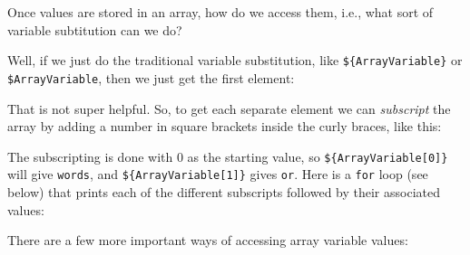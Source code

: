 \documentclass[]{krantz}
\makeatletter
\newenvironment{Shaded}{\begin{snugshade}}{\end{snugshade}}
\newcommand{\BuiltInTok}[1]{#1}
\newcommand{\CommentTok}[1]{\textcolor[rgb]{0.37,0.37,0.37}{\textit{#1}}}
\newcommand{\DataTypeTok}[1]{\textcolor[rgb]{0.27,0.27,0.27}{#1}}
\newcommand{\ExtensionTok}[1]{#1}
\newcommand{\KeywordTok}[1]{\textcolor[rgb]{0.27,0.27,0.27}{\textbf{#1}}}
\newcommand{\NormalTok}[1]{#1}
\newcommand{\VariableTok}[1]{\textcolor[rgb]{0,0,0}{#1}}
\newenvironment{kframe}{%
\medskip{}
\setlength{\fboxsep}{.8em}
 \def\at@end@of@kframe{}%
 \ifinner\ifhmode%
  \def\at@end@of@kframe{\end{minipage}}%
  \begin{minipage}{\columnwidth}%
 \fi\fi%
 \def\FrameCommand##1{\hskip\@totalleftmargin \hskip-\fboxsep
 \colorbox{shadecolor}{##1}\hskip-\fboxsep
     \hskip-\linewidth \hskip-\@totalleftmargin \hskip\columnwidth}%
 \MakeFramed {\advance\hsize-\width
   \@totalleftmargin\z@ \linewidth\hsize
   \@setminipage}}%
 {\par\unskip\endMakeFramed%
 \at@end@of@kframe}
\renewenvironment{Shaded}{\begin{kframe}}{\end{kframe}}
\makeatother
\begin{document}
Once values are stored in an array, how do we access them, i.e., what sort
of variable subtitution can we do?

Well, if we just do the traditional variable substitution, like \texttt{\$\{ArrayVariable\}} or
\texttt{\$ArrayVariable}, then we just get the first element:

\begin{Shaded}
\end{Shaded}

That is not super helpful. So, to get each separate element we can
\emph{subscript} the array by adding a number in square brackets inside the
curly braces, like this:

\begin{Shaded}
\end{Shaded}

The subscripting is done with 0 as the starting value, so \texttt{\$\{ArrayVariable{[}0{]}\}}
will give \texttt{words}, and \texttt{\$\{ArrayVariable{[}1{]}\}} gives \texttt{or}.
Here is a \texttt{for} loop (see below) that prints each of the different subscripts
followed by their associated values:

\begin{Shaded}
\end{Shaded}

There are a few more important ways of accessing array variable values:
\end{document}
